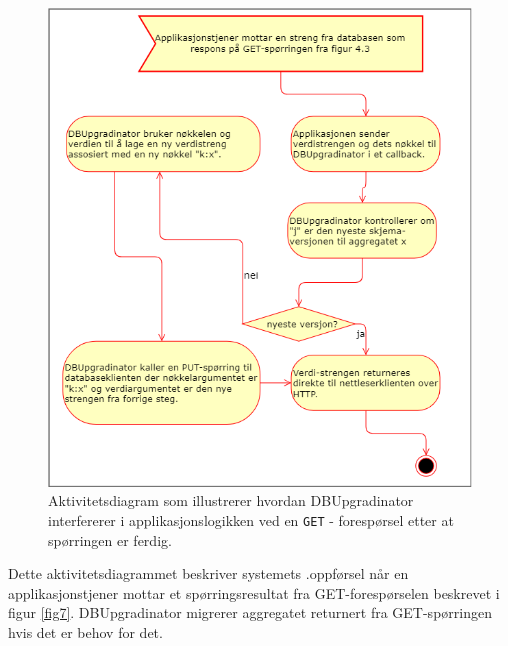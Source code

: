 \begin{figure}[!ht]
    \centering
    \includegraphics[scale=0.6]{fig/dbupgradinator-prosess-2.png}
    \caption{Aktivitetsdiagram som illustrerer hvordan DBUpgradinator interfererer i applikasjonslogikken ved en \texttt{GET} - forespørsel etter at spørringen er ferdig.}
    \label{fig8}
\end{figure}

Dette aktivitetsdiagrammet beskriver systemets .oppførsel når en applikasjonstjener mottar et spørringsresultat fra GET-forespørselen beskrevet i figur \ref{fig7}. DBUpgradinator migrerer aggregatet returnert fra GET-spørringen hvis det er behov for det.

\newpage

